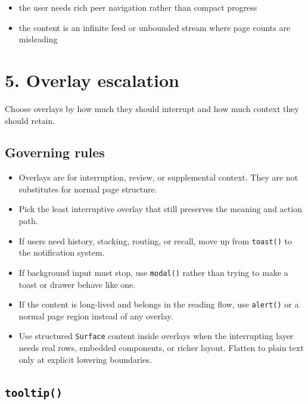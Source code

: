 \begin{itemize}
\tightlist
\item
  the user needs rich peer navigation rather than compact progress
\item
  the content is an infinite feed or unbounded stream where page counts are misleading
\end{itemize}

\section{5. Overlay escalation}\label{record-023-overlay-escalation}

Choose overlays by how much they should interrupt and how much context they should retain.

\subsection{Governing rules}\label{record-023-governing-rules-1}

\begin{itemize}
\tightlist
\item
  Overlays are for interruption, review, or supplemental context. They are not substitutes for normal page structure.
\item
  Pick the least interruptive overlay that still preserves the meaning and action path.
\item
  If users need history, stacking, routing, or recall, move up from \texttt{t\allowbreak{}o\allowbreak{}a\allowbreak{}s\allowbreak{}t\allowbreak{}(\allowbreak{})} to the notification system.
\item
  If background input must stop, use \texttt{m\allowbreak{}o\allowbreak{}d\allowbreak{}a\allowbreak{}l\allowbreak{}(\allowbreak{})} rather than trying to make a toast or drawer behave like one.
\item
  If the content is long-lived and belongs in the reading flow, use \texttt{a\allowbreak{}l\allowbreak{}e\allowbreak{}r\allowbreak{}t\allowbreak{}(\allowbreak{})} or a normal page region instead of any overlay.
\item
  Use structured \texttt{S\allowbreak{}u\allowbreak{}r\allowbreak{}f\allowbreak{}a\allowbreak{}c\allowbreak{}e} content inside overlays when the interrupting layer needs real rows, embedded components, or richer layout. Flatten to plain text only at explicit lowering boundaries.
\end{itemize}

\subsection{\texorpdfstring{\texttt{t\allowbreak{}o\allowbreak{}o\allowbreak{}l\allowbreak{}t\allowbreak{}i\allowbreak{}p\allowbreak{}(\allowbreak{})}}{}}\label{record-023-tooltip}


